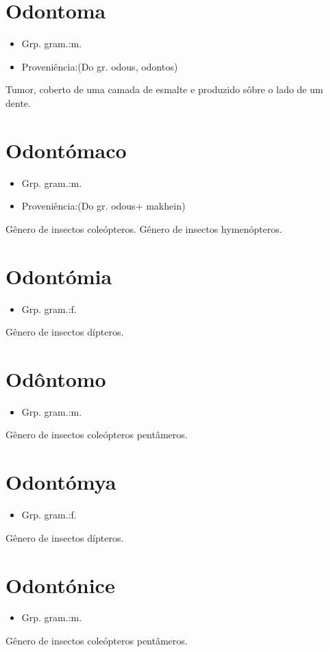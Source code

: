 \section{Odontoma}
\begin{itemize}
\item {Grp. gram.:m.}
\end{itemize}
\begin{itemize}
\item {Proveniência:(Do gr. \textunderscore odous\textunderscore , \textunderscore odontos\textunderscore )}
\end{itemize}
Tumor, coberto de uma camada de esmalte e produzido sôbre o lado de um dente.
\section{Odontómaco}
\begin{itemize}
\item {Grp. gram.:m.}
\end{itemize}
\begin{itemize}
\item {Proveniência:(Do gr. \textunderscore odous\textunderscore  + \textunderscore makhein\textunderscore )}
\end{itemize}
Gênero de insectos coleópteros.
Gênero de insectos hymenópteros.
\section{Odontómia}
\begin{itemize}
\item {Grp. gram.:f.}
\end{itemize}
Gênero de insectos dípteros.
\section{Odôntomo}
\begin{itemize}
\item {Grp. gram.:m.}
\end{itemize}
Gênero de insectos coleópteros pentâmeros.
\section{Odontómya}
\begin{itemize}
\item {Grp. gram.:f.}
\end{itemize}
Gênero de insectos dípteros.
\section{Odontónice}
\begin{itemize}
\item {Grp. gram.:m.}
\end{itemize}
Gênero de insectos coleópteros pentâmeros.
